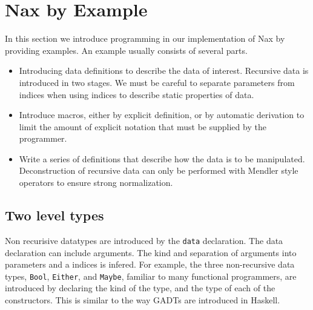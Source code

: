 
\section{Nax by Example}\label{sec:bg}

In this section we introduce programming in our implementation of Nax by providing
examples. An example usually consists of several parts.

\begin{itemize}
\item Introducing data definitions to describe the data of interest. Recursive
data is introduced in two stages. We must be careful to separate parameters
from indices when using indices to describe static properties of data.

\item Introduce macros, either by explicit definition, or by automatic derivation
to limit the amount of explicit notation that must be supplied by the programmer.

\item Write a series of definitions that describe how the data is to be
manipulated. Deconstruction of recursive data can only be performed with Mendler style operators
to ensure strong normalization.

\end{itemize}

\subsection{Two level types}\label{2level}
Non recurisive datatypes are introduced by the \verb+data+ declaration.
The data declaration can include arguments. The kind and separation of
arguments into parameters and a indices is infered. For example, 
the three non-recursive data types, \verb+Bool+, \verb+Either+, and 
\verb+Maybe+, familiar to many functional programmers, are introduced
by declaring the kind of the type, and the type of each of the
constructors. This is similar to the way {\small GADT}s are introduced in Haskell.

